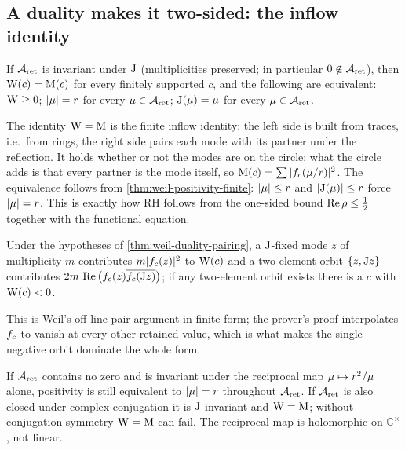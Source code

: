 \subsection{A duality makes it two-sided: the inflow identity}

\begin{theorem}
\label{thm:weil-duality-pairing}
If $\mathcal A_{\mathrm{ret}}$ is invariant under $\mathrm{J}$ (multiplicities preserved; in particular
$0\notin\mathcal A_{\mathrm{ret}}$), then $\mathrm{W}(c) = \mathrm{M}(c)$ for every finitely supported $c$, and the
following are equivalent: $\mathrm{W}\ge0$; $|\mu| = r$ for every $\mu\in\mathcal A_{\mathrm{ret}}$;
$\mathrm{J}(\mu) = \mu$ for every $\mu\in\mathcal A_{\mathrm{ret}}$.
\end{theorem}

The identity $\mathrm{W} = \mathrm{M}$ is the finite inflow identity: the left side is built
from traces, i.e.\ from rings, the right side pairs each mode with its partner under the
reflection. It holds whether or not the modes are on the circle; what the circle adds is
that every partner is the mode itself, so $\mathrm{M}(c) = \sum|f_{c}(\mu/r)|^2$.
The equivalence follows from \cref{thm:weil-positivity-finite}: $|\mu|\le r$ and
$|\mathrm{J}(\mu)|\le r$ force $|\mu| = r$. This is exactly how RH follows
from the one-sided bound $\operatorname{Re}\rho\le\frac12$ together with the functional equation.

\begin{proposition}
\label{prop:weil-orbit-negative}
Under the hypotheses of \cref{thm:weil-duality-pairing}, a $\mathrm{J}$-fixed mode $z$ of
multiplicity $m$ contributes $m|f_{c}(z)|^2$ to $\mathrm{W}(c)$ and a two-element orbit
$\{z,\mathrm{J} z\}$ contributes $2m\,\operatorname{Re}\big(f_{c}(z)\overline{f_{c}(\mathrm{J} z)}\big)$;
if any two-element orbit exists there is a $c$ with $\mathrm{W}(c)<0$.
\end{proposition}

This is Weil's off-line pair argument in finite form; the prover's proof interpolates
$f_{c}$ to vanish at every other retained value, which is what makes the single
negative orbit dominate the whole form.

\begin{proposition}
\label{prop:weil-reciprocal-only}
If $\mathcal A_{\mathrm{ret}}$ contains no zero and is invariant under the reciprocal map
$\mu\mapsto r^2/\mu$ alone, positivity is still equivalent to $|\mu| =
r$ throughout $\mathcal A_{\mathrm{ret}}$. If $\mathcal A_{\mathrm{ret}}$ is also closed under complex conjugation it is
$\mathrm{J}$-invariant and $\mathrm{W} = \mathrm{M}$; without conjugation symmetry $\mathrm{W} = \mathrm{M}$
can fail. The reciprocal map is holomorphic on $\mathbb C^\times$, not linear.
\end{proposition}

